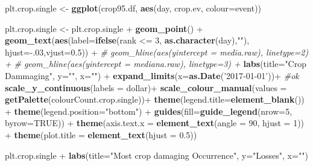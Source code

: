 \documentclass[]{article}
\newenvironment{Shaded}{\begin{snugshade}}{\end{snugshade}}
\newcommand{\KeywordTok}[1]{\textcolor[rgb]{0.13,0.29,0.53}{\textbf{{#1}}}}
\newcommand{\DataTypeTok}[1]{\textcolor[rgb]{0.13,0.29,0.53}{{#1}}}
\newcommand{\DecValTok}[1]{\textcolor[rgb]{0.00,0.00,0.81}{{#1}}}
\newcommand{\FloatTok}[1]{\textcolor[rgb]{0.00,0.00,0.81}{{#1}}}
\newcommand{\StringTok}[1]{\textcolor[rgb]{0.31,0.60,0.02}{{#1}}}
\newcommand{\CommentTok}[1]{\textcolor[rgb]{0.56,0.35,0.01}{\textit{{#1}}}}
\newcommand{\OtherTok}[1]{\textcolor[rgb]{0.56,0.35,0.01}{{#1}}}
\newcommand{\NormalTok}[1]{{#1}}
\begin{document}
\begin{Shaded}
\begin{Highlighting}[]
\NormalTok{plt.crop.single <-}\StringTok{ }\KeywordTok{ggplot}\NormalTok{(crop95.df, }\KeywordTok{aes}\NormalTok{(day, crop.ev, }\DataTypeTok{colour=}\NormalTok{event))}

\NormalTok{plt.crop.single <-}\StringTok{ }\NormalTok{plt.crop.single +}\StringTok{ }\KeywordTok{geom_point}\NormalTok{() +}
\StringTok{        }\KeywordTok{geom_text}\NormalTok{(}\KeywordTok{aes}\NormalTok{(}\DataTypeTok{label=}\KeywordTok{ifelse}\NormalTok{(rank <=}\StringTok{ }\DecValTok{3}\NormalTok{,}
                \KeywordTok{as.character}\NormalTok{(day),}\StringTok{""}\NormalTok{),}
                \DataTypeTok{hjust=}\NormalTok{-.}\DecValTok{03}\NormalTok{,}\DataTypeTok{vjust=}\FloatTok{0.5}\NormalTok{)) +}
\StringTok{        }\CommentTok{# geom_hline(aes(yintercept = media.raw), linetype=2) +}
\StringTok{        }\CommentTok{# geom_hline(aes(yintercept = mediana.raw), linetype=3) +}
\StringTok{        }\KeywordTok{labs}\NormalTok{(}\DataTypeTok{title=}\StringTok{"Crop Dammaging"}\NormalTok{,}
                    \DataTypeTok{y=}\StringTok{""}\NormalTok{, }\DataTypeTok{x=}\StringTok{""}\NormalTok{) +}\StringTok{ }
\StringTok{                }
\StringTok{        }\KeywordTok{expand_limits}\NormalTok{(}\DataTypeTok{x=}\KeywordTok{as.Date}\NormalTok{(}\StringTok{'2017-01-01'}\NormalTok{))+}\StringTok{ }\CommentTok{#ok}
\StringTok{        }\KeywordTok{scale_y_continuous}\NormalTok{(}\DataTypeTok{labels =} \NormalTok{dollar)+}
\StringTok{        }
\StringTok{        }\KeywordTok{scale_colour_manual}\NormalTok{(}\DataTypeTok{values =} \KeywordTok{getPalette}\NormalTok{(colourCount.crop.single))+}\StringTok{                }
\StringTok{        }\KeywordTok{theme}\NormalTok{(}\DataTypeTok{legend.title=}\KeywordTok{element_blank}\NormalTok{()) +}
\StringTok{        }\KeywordTok{theme}\NormalTok{(}\DataTypeTok{legend.position=}\StringTok{"bottom"}\NormalTok{) +}
\StringTok{        }\KeywordTok{guides}\NormalTok{(}\DataTypeTok{fill=}\KeywordTok{guide_legend}\NormalTok{(}\DataTypeTok{nrow=}\DecValTok{5}\NormalTok{, }\DataTypeTok{byrow=}\OtherTok{TRUE}\NormalTok{)) +}
\StringTok{        }\KeywordTok{theme}\NormalTok{(}\DataTypeTok{axis.text.x =} \KeywordTok{element_text}\NormalTok{(}\DataTypeTok{angle =} \DecValTok{90}\NormalTok{, }\DataTypeTok{hjust =} \DecValTok{1}\NormalTok{)) +}\StringTok{ }
\StringTok{        }\KeywordTok{theme}\NormalTok{(}\DataTypeTok{plot.title =} \KeywordTok{element_text}\NormalTok{(}\DataTypeTok{hjust =} \FloatTok{0.5}\NormalTok{)) }

\NormalTok{plt.crop.single +}\StringTok{ }\KeywordTok{labs}\NormalTok{(}\DataTypeTok{title=}\StringTok{"Most crop damaging Occurrence"}\NormalTok{,}
                    \DataTypeTok{y=}\StringTok{"Losses"}\NormalTok{, }\DataTypeTok{x=}\StringTok{""}\NormalTok{)}
\end{Highlighting}
\end{Shaded}
\end{document}
